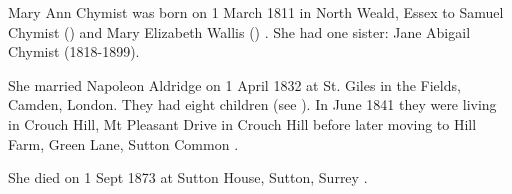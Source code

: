 
Mary Ann Chymist was born on 1 March 1811 in North Weald, Essex to Samuel Chymist () and Mary Elizabeth Wallis () \cite{MaryAnnCBirth}. She had one sister: Jane Abigail Chymist (1818-1899).

She married Napoleon Aldridge on 1 April 1832 at St. Giles in the Fields, Camden, London.  They had eight children (see ).  In June 1841 they were living in Crouch Hill, Mt Pleasant Drive in Crouch Hill \cite{MaryAnnCResidence} before later moving to Hill Farm, Green Lane, Sutton Common \cite{MaryAnnCFarm}.

She died on 1 Sept 1873 at Sutton House, Sutton, Surrey \cite{MaryAnnCDeath}.
